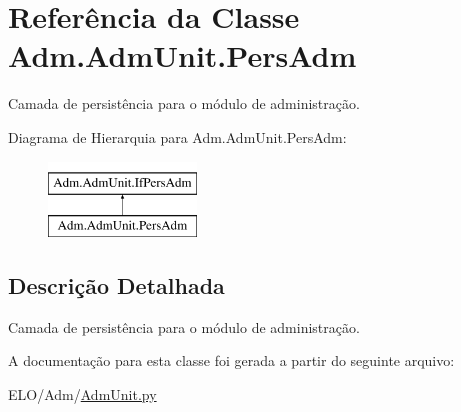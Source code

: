 \hypertarget{classAdm_1_1AdmUnit_1_1PersAdm}{\section{Referência da Classe Adm.\-Adm\-Unit.\-Pers\-Adm}
\label{classAdm_1_1AdmUnit_1_1PersAdm}
}


Camada de persistência para o módulo de administração.  


Diagrama de Hierarquia para Adm.\-Adm\-Unit.\-Pers\-Adm\-:\begin{figure}[H]
\begin{center}
\leavevmode
\includegraphics[height=2.000000cm]{dc/d1a/classAdm_1_1AdmUnit_1_1PersAdm}
\end{center}
\end{figure}


\subsection{Descrição Detalhada}
Camada de persistência para o módulo de administração. 



A documentação para esta classe foi gerada a partir do seguinte arquivo\-:\begin{DoxyCompactItemize}
\item 
E\-L\-O/\-Adm/\hyperlink{AdmUnit_8py}{Adm\-Unit.\-py}\end{DoxyCompactItemize}
